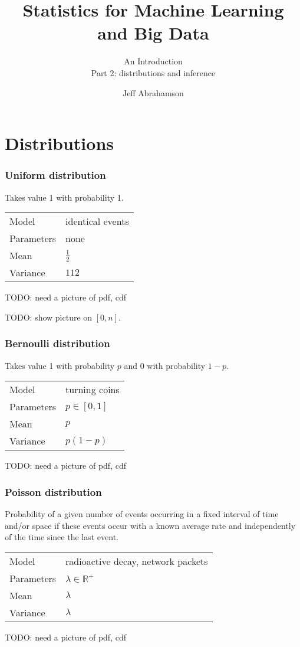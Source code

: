 \documentclass[t]{beamer}
\title
{Statistics for Machine Learning and Big Data}
\subtitle{An Introduction\\[6mm] Part 2: distributions and inference}
\author[Abrahamson] {Jeff Abrahamson}
\newcommand\R[0]{\mathbb{R}}
\begin{document}
\begin{frame}
  \titlepage
\end{frame}

\section{Distributions}

\begin{frame}
  \frametitle{Uniform distribution}

  Takes value 1 with probability 1.
  \bigskip
  
  \begin{tabular}{ll}
    Model & identical events\\[1mm]
    Parameters & none\\[1mm]
    Mean & $\frac 12$\\[1mm]
    Variance & $1{12}$
  \end{tabular}

  TODO: need a picture of pdf, cdf
  
  
  TODO: show picture on $[0,n]$.

\end{frame}
\begin{frame}
  \frametitle{Bernoulli distribution}

  Takes value 1 with probability $p$ and 0 with probability $1-p$.
  \bigskip
  
  \begin{tabular}{ll}
    Model & turning coins\\[1mm]
    Parameters & $p\in [0,1]$\\[1mm]
    Mean & $p$\\[1mm]
    Variance & $p(1-p)$
  \end{tabular}

  TODO: need a picture of pdf, cdf
  
  \note{

  }
  
\end{frame}

\begin{frame}
  \frametitle{Poisson distribution}

  Probability of a given number of events occurring in a fixed
  interval of time and/or space if these events occur with a known
  average rate and independently of the time since the last event.
  \bigskip
  
  \begin{tabular}{ll}
    Model & radioactive decay, network packets\\[1mm]
    Parameters & $\lambda\in \R^+$\\[1mm]
    Mean & $\lambda$\\[1mm]
    Variance & $\lambda$
  \end{tabular}

  TODO: need a picture of pdf, cdf
  
  \note{

  }
  
\end{frame}
\end{document}
